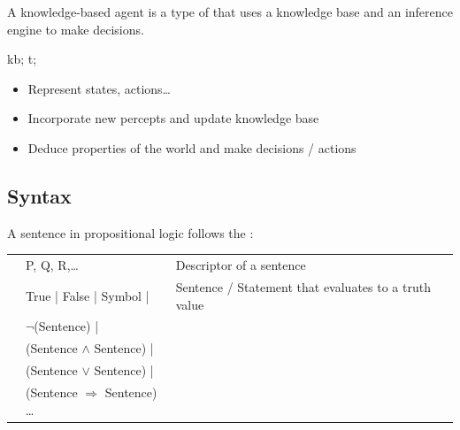 \documentclass[
../EiKI_Summary.tex,
]
{subfiles}
\begin{document}
\begin{defbox}
    A knowledge-based agent is a type of  that uses a knowledge base and an inference engine to make decisions. 

    \begin{codebox*}
        \begin{algorithm}[H]

            kb; 
            t; 
        \end{algorithm}
    \end{codebox*}

    \begin{itemize}
        \item Represent states, actions\dots
        \item Incorporate new percepts and update knowledge base
        \item Deduce properties of the world and make decisions / actions
    \end{itemize}
\end{defbox}

\newpage
\subsection{Syntax}
A sentence in propositional logic follows the :

\begin{tabular}{r l l}
    {Symbol:}   & P, Q, R,\dots & Descriptor of a sentence\\
    {Sentence:} & True | False | Symbol | & Sentence / Statement that evaluates to a truth value\\
    & $\neg$(Sentence) | &\\
    & (Sentence $\land$ Sentence) | &\\
    & (Sentence $\lor$ Sentence) | &\\
    & (Sentence $\Rightarrow$ Sentence) \dots &\\
\end{tabular}
\end{document}
